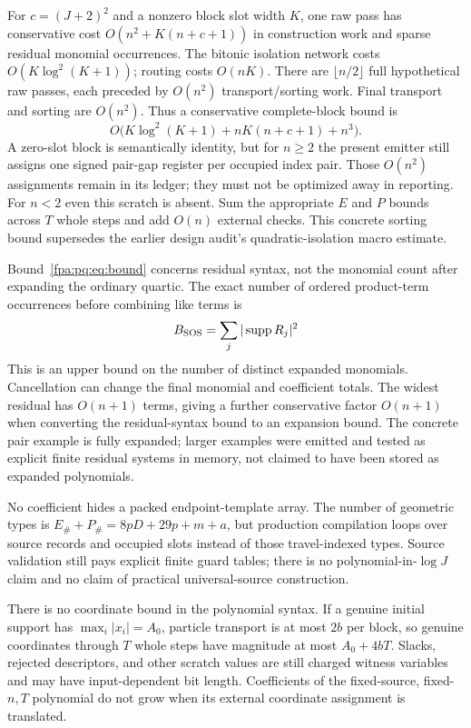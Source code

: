 \documentclass[11pt,a4paper]{article}
\numberwithin{equation}{section}
\newcommand{\supp}{\operatorname{supp}}\newcommand{\Swap}{\operatorname{Swap}}
\begin{document}
For $c=(J+2)^2$ and a nonzero block slot width $K$, one raw pass has conservative cost $O(n^2+K(n+c+1))$ in construction work and sparse residual monomial occurrences. The bitonic isolation network costs $O(K\log^2(K+1))$; routing costs $O(nK)$. There are $\lfloor n/2\rfloor$ full hypothetical raw passes, each preceded by $O(n^2)$ transport/sorting work. Final transport and sorting are $O(n^2)$. Thus a conservative complete-block bound is
\begin{equation}\label{fpa:pq:eq:bound}
O\bigl(K\log^2(K+1)+nK(n+c+1)+n^3\bigr).
\end{equation}
A zero-slot block is semantically identity, but for $n\ge2$ the present emitter still assigns one signed pair-gap register per occupied index pair. Those $O(n^2)$ assignments remain in its ledger; they must not be optimized away in reporting. For $n<2$ even this scratch is absent. Sum the appropriate $E$ and $P$ bounds across $T$ whole steps and add $O(n)$ external checks. This concrete sorting bound supersedes the earlier design audit's quadratic-isolation macro estimate.

Bound~\eqref{fpa:pq:eq:bound} concerns residual syntax, not the monomial count after expanding the ordinary quartic. The exact number of ordered product-term occurrences before combining like terms is
\begin{equation}\label{fpa:pq:eq:expand}
B_{\rm SOS}=\sum_j|\supp R_j|^2
\end{equation}
This is an upper bound on the number of distinct expanded monomials. Cancellation can change the final monomial and coefficient totals. The widest residual has $O(n+1)$ terms, giving a further conservative factor $O(n+1)$ when converting the residual-syntax bound to an expansion bound. The concrete pair example is fully expanded; larger examples were emitted and tested as explicit finite residual systems in memory, not claimed to have been stored as expanded polynomials.

No coefficient hides a packed endpoint-template array. The number of geometric types is
$E_\#+P_\#=8pD+29p+m+a$, but production compilation loops over source records and occupied slots instead of those travel-indexed types. Source validation still pays explicit finite guard tables; there is no polynomial-in-$\log J$ claim and no claim of practical universal-source construction.

There is no coordinate bound in the polynomial syntax. If a genuine initial support has $\max_i|x_i|=A_0$, particle transport is at most $2b$ per block, so genuine coordinates through $T$ whole steps have magnitude at most $A_0+4bT$. Slacks, rejected descriptors, and other scratch values are still charged witness variables and may have input-dependent bit length. Coefficients of the fixed-source, fixed-$n,T$ polynomial do not grow when its external coordinate assignment is translated.
\end{document}
